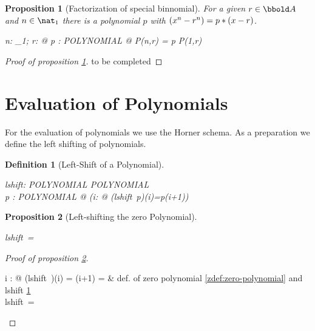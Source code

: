 \documentclass[12pt]{scrartcl}
\newtheorem{prop}{Proposition}[section]
\newtheorem{zdef}{Definition}[section]
\begin{document}
\begin{prop}[Factorization of special binnomial]
  \label{prop:factorization-binomial}
  For a given $r \in \arithmos$ and $n \in \nat_1$ there is a polynomial
  $p$ with $(x^n-r^n) = p * (x - r)$.
  \begin{zed}
    \forall n: \nat_1; r: \arithmos @ \exists p : POLYNOMIAL @ P(n,r) = p
    \polymult P(1,r)
  \end{zed}
\end{prop}

\begin{proof}[Proof of proposition \ref{prop:factorization-binomial}]
  to be completed
\end{proof}

\section{Evaluation of Polynomials}
\label{sec:evaluation}

For the evaluation of polynomials we use the Horner schema. As a
preparation we define the left shifting of polynomials.
 
\begin{zdef}[Left-Shift of a Polynomial]
  \label{zdef:left-shift}
  \begin{axdef}
    lshift: POLYNOMIAL \fun POLYNOMIAL \\
    \where
    \forall p : POLYNOMIAL @ (\forall i: \nat @ (lshift~p)(i)=p(i+1))
  \end{axdef}
\end{zdef}

\begin{prop}[Left-shifting the zero Polynomial]
  \label{prop:left-shift-zero-polynomial}
  \begin{zed}
    lshift~\zeropol = \zeropol
  \end{zed}
\end{prop}

\begin{proof}[Proof of proposition
  \ref{prop:left-shift-zero-polynomial}]
  \begin{argue}
    \forall i : \nat @ (lshift~\zeropol)(i) = \zeropol(i+1) = \azero &
    def. of zero polynomial  \ref{zdef:zero-polynomial} and
    lshift \ref{zdef:left-shift}\\
    \vdash lshift~\zeropol = \zeropol \\
  \end{argue}
  
\end{proof}
\end{document}
